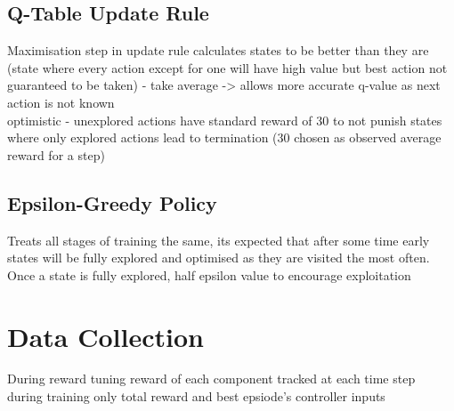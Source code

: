 \subsection{Q-Table Update Rule}
Maximisation step in update rule calculates states to be better than they are (state where every action except for one will have high value but best action not guaranteed to be taken) - take average -> allows more accurate q-value as next action is not known
\\ optimistic - unexplored actions have standard reward of 30 to not punish states where only explored actions lead to termination (30 chosen as observed average reward for a step)

\subsection{Epsilon-Greedy Policy}
Treats all stages of training the same, its expected that after some time early states will be fully explored and optimised as they are visited the most often. Once a state is fully explored, half epsilon value to encourage exploitation

\section{Data Collection}
During reward tuning reward of each component tracked at each time step
\\ during training only total reward and best epsiode's controller inputs
